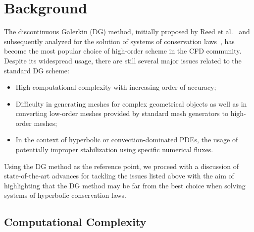 \section{Background}
\label{sec:intro_background}

The discontinuous Galerkin (DG) method, initially proposed by Reed et
al.~\cite{Reed1973} and subsequently analyzed for the solution of systems of
conservation
laws~\cite{Cockburn1991,Cockburn1989a,Cockburn1989b,Cockburn1990,Cockburn1998},
has become the most popular choice of high-order scheme in the CFD community.
Despite its widespread usage, there are still several major issues related to
the standard DG scheme:
\begin{itemize}
\item High computational complexity with increasing order of accuracy;
\item Difficulty in generating meshes for complex geometrical objects as well as
  in converting low-order meshes provided by standard mesh generators to
  high-order meshes;
\item In the context of hyperbolic or convection-dominated PDEs, the usage of
  potentially improper stabilization using specific numerical fluxes.
\end{itemize}

Using the DG method as the reference point, we proceed with a discussion of
state-of-the-art advances for tackling the issues listed above with the aim
of highlighting that the DG method may be far from the best choice when
solving systems of hyperbolic conservation laws.

\subsection{Computational Complexity}
